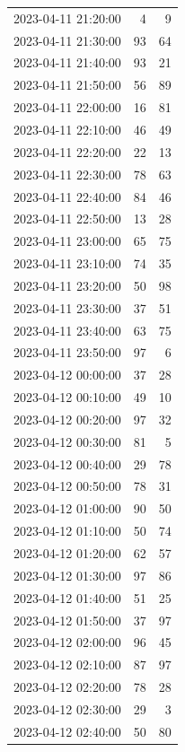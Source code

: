 \documentclass[
  letterpaper,
  DIV=11,
  numbers=noendperiod]{scrartcl}
\begin{document}
\begin{tabular}{lrr}
2023-04-11 21:20:00 &     4 &     9 \\
2023-04-11 21:30:00 &    93 &    64 \\
2023-04-11 21:40:00 &    93 &    21 \\
2023-04-11 21:50:00 &    56 &    89 \\
2023-04-11 22:00:00 &    16 &    81 \\
2023-04-11 22:10:00 &    46 &    49 \\
2023-04-11 22:20:00 &    22 &    13 \\
2023-04-11 22:30:00 &    78 &    63 \\
2023-04-11 22:40:00 &    84 &    46 \\
2023-04-11 22:50:00 &    13 &    28 \\
2023-04-11 23:00:00 &    65 &    75 \\
2023-04-11 23:10:00 &    74 &    35 \\
2023-04-11 23:20:00 &    50 &    98 \\
2023-04-11 23:30:00 &    37 &    51 \\
2023-04-11 23:40:00 &    63 &    75 \\
2023-04-11 23:50:00 &    97 &     6 \\
2023-04-12 00:00:00 &    37 &    28 \\
2023-04-12 00:10:00 &    49 &    10 \\
2023-04-12 00:20:00 &    97 &    32 \\
2023-04-12 00:30:00 &    81 &     5 \\
2023-04-12 00:40:00 &    29 &    78 \\
2023-04-12 00:50:00 &    78 &    31 \\
2023-04-12 01:00:00 &    90 &    50 \\
2023-04-12 01:10:00 &    50 &    74 \\
2023-04-12 01:20:00 &    62 &    57 \\
2023-04-12 01:30:00 &    97 &    86 \\
2023-04-12 01:40:00 &    51 &    25 \\
2023-04-12 01:50:00 &    37 &    97 \\
2023-04-12 02:00:00 &    96 &    45 \\
2023-04-12 02:10:00 &    87 &    97 \\
2023-04-12 02:20:00 &    78 &    28 \\
2023-04-12 02:30:00 &    29 &     3 \\
2023-04-12 02:40:00 &    50 &    80 \\

\end{tabular}
\end{document}
